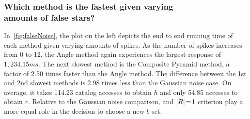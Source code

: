 \begin{figure*}
\end{figure*}

\subsubsection{Which method is the fastest given varying \\ amounts of false stars?}
In~\autoref{fig:falseNoise}, the plot on the left depicts the end to end running time of each method given varying
amounts of spikes.
As the number of spikes increases from 0 to 12, the Angle method again experiences the largest response of
$1{,}234.15\si{ms}$.
The next slowest method is the Composite Pyramid method, a factor of 2.50 times faster than the Angle method.
The difference between the 1st and 2nd slowest methods is 2.98 times less than the Gaussian noise case.
On average, it takes 114.23 catalog accesses to obtain $h$ and only 54.85 accesses to obtain $r$.
Relative to the Gaussian noise comparison,  and $\left| R \right| \!=\! 1$ criterion play a more equal role in
the decision to choose a new $b$ set.

